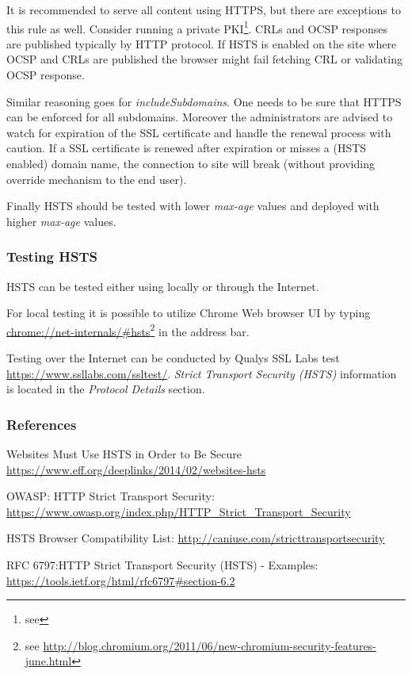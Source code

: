 It is recommended to serve all content using HTTPS, but there are exceptions to this rule as well. Consider running a private PKI\footnote{see }. CRLs and OCSP responses are published typically by HTTP protocol. If HSTS is enabled on the site where OCSP and CRLs are published the browser might fail fetching CRL or validating OCSP response.

Similar reasoning goes for \emph{includeSubdomains}. One needs to be sure that HTTPS can be enforced for all subdomains. Moreover the administrators are advised to watch for expiration of the SSL certificate and handle the renewal process with caution. If a SSL certificate is renewed after expiration or misses a (HSTS enabled) domain name, the connection to site will break (without providing override mechanism to the end user).  

Finally HSTS should be tested with lower \emph{max-age} values and deployed with higher \emph{max-age} values. 

\subsubsection{Testing HSTS}
\label{subsubsection:Testing HSTS}
HSTS can be tested either using locally or through the Internet. 

For local testing it is possible to utilize Chrome Web browser UI by typing \url{chrome://net-internals/#hsts}\footnote{see \url{http://blog.chromium.org/2011/06/new-chromium-security-features-june.html}} in the address bar.

Testing over the Internet can be conducted by Qualys SSL Labs test \url{https://www.ssllabs.com/ssltest/}. \emph{Strict Transport Security (HSTS)} information is located in the \emph{Protocol Details} section.

\subsubsection{References}
\begin{itemize*}
	\item Websites Must Use HSTS in Order to Be Secure \url{https://www.eff.org/deeplinks/2014/02/websites-hsts}
	\item OWASP: HTTP Strict Transport Security: \url{https://www.owasp.org/index.php/HTTP_Strict_Transport_Security}
	\item HSTS Browser Compatibility List: \url{http://caniuse.com/stricttransportsecurity}
  \item RFC 6797:HTTP Strict Transport Security (HSTS) - Examples: \url{https://tools.ietf.org/html/rfc6797#section-6.2}
\end{itemize*}


